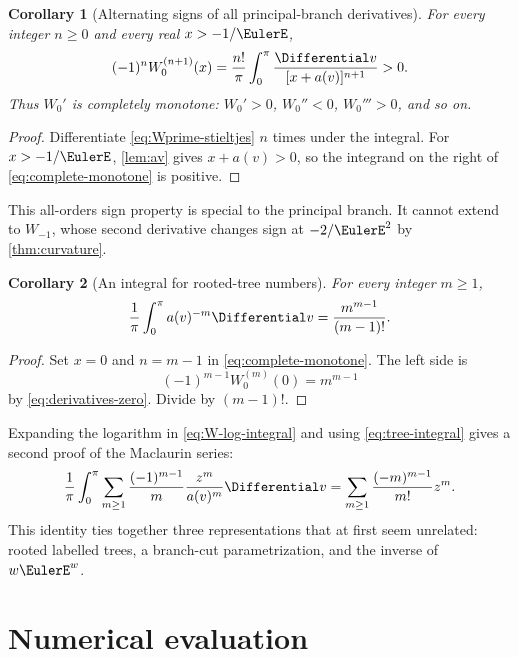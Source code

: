 \documentclass[11pt]{article}
\newtheorem{corollary}[corollary]{Corollary}
\theoremstyle{remark}
\begin{document}
\begin{corollary}[Alternating signs of all principal-branch derivatives]
For every integer \(n\geq0\) and every real \(x>-1/\EulerE\),
\begin{equation}\label{eq:complete-monotone}
 (-1)^n W_0^{(n+1)}(x)
 =\frac{n!}{\pi}\int_0^\pi
 \frac{\Differential v}{[x+a(v)]^{n+1}}>0.
\end{equation}
Thus \(W_0'\) is completely monotone: \(W_0'>0\),
\(W_0''<0\), \(W_0'''>0\), and so on.
\end{corollary}

\begin{proof}
Differentiate \eqref{eq:Wprime-stieltjes} \(n\) times under the integral.
For \(x>-1/\EulerE\), \cref{lem:av} gives \(x+a(v)>0\), so the integrand on
the right of \eqref{eq:complete-monotone} is positive.
\end{proof}

This all-orders sign property is special to the principal branch.  It cannot
extend to \(W_{-1}\), whose second derivative changes sign at
\(-2/\EulerE^2\) by \cref{thm:curvature}.

\begin{corollary}[An integral for rooted-tree numbers]\label{cor:tree-integral}
For every integer \(m\geq1\),
\begin{equation}\label{eq:tree-integral}
 \frac1\pi\int_0^\pi a(v)^{-m}\Differential v
 =\frac{m^{m-1}}{(m-1)!}.
\end{equation}
\end{corollary}

\begin{proof}
Set \(x=0\) and \(n=m-1\) in
\eqref{eq:complete-monotone}.  The left side is
\[
       (-1)^{m-1}W_0^{(m)}(0)
       =m^{m-1}
\]
by \eqref{eq:derivatives-zero}.  Divide by \((m-1)!\).
\end{proof}

Expanding the logarithm in \eqref{eq:W-log-integral} and using
\eqref{eq:tree-integral} gives a second proof of the Maclaurin series:
\[
 \frac1\pi\int_0^\pi\sum_{m\geq1}
 \frac{(-1)^{m-1}}m\frac{z^m}{a(v)^m}\Differential v
 =
 \sum_{m\geq1}\frac{(-m)^{m-1}}{m!}z^m.
\]
This identity ties together three representations that at first seem
unrelated: rooted labelled trees, a branch-cut parametrization, and the
inverse of \(w\EulerE^w\).


\section{Numerical evaluation}\label{sec:numerics}
\end{document}
